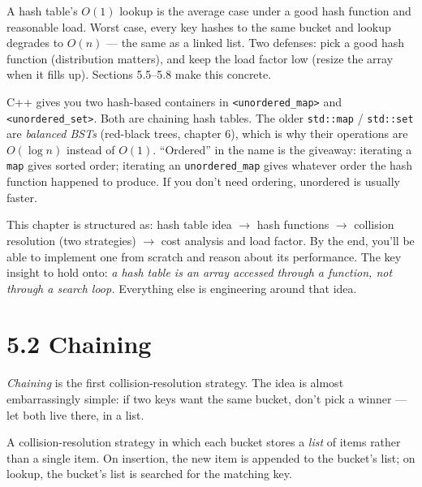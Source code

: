 \documentclass[11pt]{article}
\begin{document}
\begin{warnbox}
A hash table's $O(1)$ lookup is the average case under a good
hash function and reasonable load. Worst case, every key hashes
to the same bucket and lookup degrades to $O(n)$ --- the same as
a linked list. Two defenses: pick a good hash function
(distribution matters), and keep the load factor low (resize the
array when it fills up). Sections 5.5--5.8 make this concrete.
\end{warnbox}

\begin{notebox}
C++ gives you two hash-based containers in \texttt{<unordered\_map>}
and \texttt{<unordered\_set>}. Both are chaining hash tables. The
older \texttt{std::map} / \texttt{std::set} are \emph{balanced
BSTs} (red-black trees, chapter 6), which is why their operations
are $O(\log n)$ instead of $O(1)$. ``Ordered'' in the name is the
giveaway: iterating a \texttt{map} gives sorted order; iterating
an \texttt{unordered\_map} gives whatever order the hash function
happened to produce. If you don't need ordering, unordered is
usually faster.
\end{notebox}

\begin{ideabox}
This chapter is structured as: hash table idea $\to$ hash
functions $\to$ collision resolution (two strategies) $\to$
cost analysis and load factor. By the end, you'll be able to
implement one from scratch and reason about its performance.
The key insight to hold onto: \emph{a hash table is an array
accessed through a function, not through a search loop.}
Everything else is engineering around that idea.
\end{ideabox}

\section{5.2 Chaining}

\emph{Chaining} is the first collision-resolution strategy. The
idea is almost embarrassingly simple: if two keys want the same
bucket, don't pick a winner --- let both live there, in a list.

\begin{defnbox}[Chaining]
A collision-resolution strategy in which each bucket stores a
\emph{list} of items rather than a single item. On insertion,
the new item is appended to the bucket's list; on lookup, the
bucket's list is searched for the matching key.
\end{defnbox}
\end{document}
